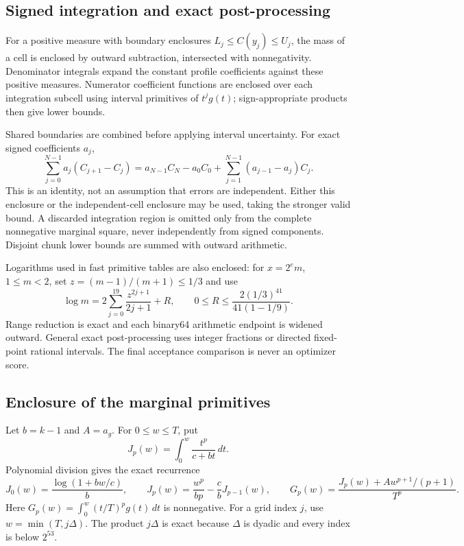 \documentclass[11pt,a4paper]{article}
\theoremstyle{definition}\newtheorem{definition}[theorem]{Definition}
\theoremstyle{remark}\newtheorem{remark}[theorem]{Remark}
\numberwithin{equation}{section}
\begin{document}
\subsection{Signed integration and exact post-processing}
For a positive measure with boundary enclosures $L_j\le C(y_j)\le U_j$, the mass of a cell is enclosed by outward subtraction, intersected with nonnegativity. Denominator integrals expand the constant profile coefficients against these positive measures. Numerator coefficient functions are enclosed over each integration subcell using interval primitives of $t^jg(t)$; sign-appropriate products then give lower bounds.

Shared boundaries are combined before applying interval uncertainty. For exact signed coefficients $a_j$,
\begin{equation}\label{eq:abel}
\sum_{j=0}^{N-1}a_j(C_{j+1}-C_j)
=a_{N-1}C_N-a_0C_0+\sum_{j=1}^{N-1}(a_{j-1}-a_j)C_j.
\end{equation}
This is an identity, not an assumption that errors are independent. Either this enclosure or the independent-cell enclosure may be used, taking the stronger valid bound. A discarded integration region is omitted only from the complete nonnegative marginal square, never independently from signed components. Disjoint chunk lower bounds are summed with outward arithmetic.

Logarithms used in fast primitive tables are also enclosed: for $x=2^em$, $1\le m<2$, set $z=(m-1)/(m+1)\le1/3$ and use
\[
 \log m=2\sum_{j=0}^{19}\frac{z^{2j+1}}{2j+1}+R,\qquad
 0\le R\le\frac{2(1/3)^{41}}{41(1-1/9)}.
\]
Range reduction is exact and each binary64 arithmetic endpoint is widened outward. General exact post-processing uses integer fractions or directed fixed-point rational intervals. The final acceptance comparison is never an optimizer score.

\subsection{Enclosure of the marginal primitives}
Let $b=k-1$ and $A=a_g$. For $0\le w\le T$, put
\[
 J_p(w)=\int_0^w\frac{t^p}{c+bt}\,dt.
\]
Polynomial division gives the exact recurrence
\[
 J_0(w)=\frac{\log(1+bw/c)}b,\qquad
 J_p(w)=\frac{w^p}{bp}-\frac cbJ_{p-1}(w),\qquad
 G_p(w)=\frac{J_p(w)+Aw^{p+1}/(p+1)}{T^p}.
\]
Here $G_p(w)=\int_0^w(t/T)^pg(t)\,dt$ is nonnegative. For a grid index $j$, use $w=\min(T,j\Delta)$. The product $j\Delta$ is exact because $\Delta$ is dyadic and every index is below $2^{53}$.
\end{document}
